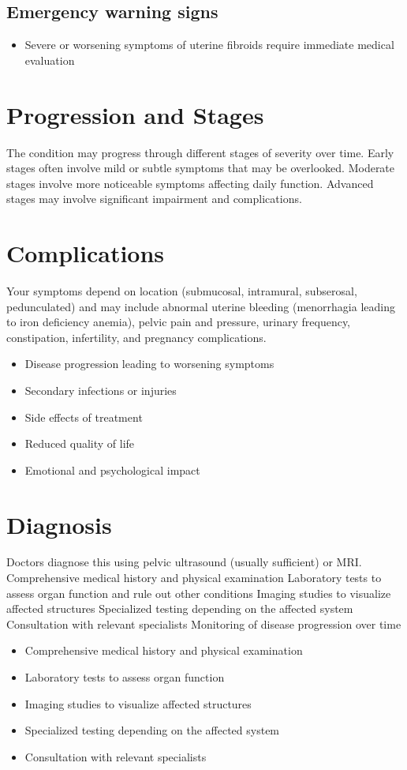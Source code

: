 \subsection{Emergency warning signs}
\begin{itemize}[noitemsep]
  \item Severe or worsening symptoms of uterine fibroids require immediate medical evaluation
\end{itemize}
\section{Progression and Stages}
The condition may progress through different stages of severity over time. Early stages often involve mild or subtle symptoms that may be overlooked. Moderate stages involve more noticeable symptoms affecting daily function. Advanced stages may involve significant impairment and complications.
\section{Complications}
Your symptoms depend on location (submucosal, intramural, subserosal, pedunculated) and may include abnormal uterine bleeding (menorrhagia leading to iron deficiency anemia), pelvic pain and pressure, urinary frequency, constipation, infertility, and pregnancy complications.

\begin{itemize}[noitemsep]
  \item Disease progression leading to worsening symptoms
  \item Secondary infections or injuries
  \item Side effects of treatment
  \item Reduced quality of life
  \item Emotional and psychological impact
\end{itemize}
\section{Diagnosis}
Doctors diagnose this using pelvic ultrasound (usually sufficient) or MRI. Comprehensive medical history and physical examination Laboratory tests to assess organ function and rule out other conditions Imaging studies to visualize affected structures Specialized testing depending on the affected system Consultation with relevant specialists Monitoring of disease progression over time

\begin{itemize}[noitemsep]
  \item Comprehensive medical history and physical examination
  \item Laboratory tests to assess organ function
  \item Imaging studies to visualize affected structures
  \item Specialized testing depending on the affected system
  \item Consultation with relevant specialists
\end{itemize}
